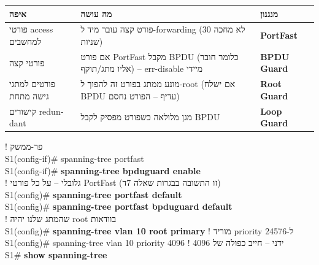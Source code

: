 \documentclass[11pt]{article}
\newcommand{\enLR}[1]{\textenglish{#1}}
\begin{document}
\begin{xltabular}{\linewidth}{|>{\setRTL\raggedleft\arraybackslash}X|>{\setRTL\raggedleft\arraybackslash}X|>{\setRTL\raggedleft\arraybackslash}X|}
\hline
{}\textbf{איפה} & \textbf{מה עושה} & \textbf{מנגנון} \\
\hline
\endhead
פורטי \enLR{access} למחשבים & פורט קצה עובר מיד ל-\enLR{forwarding} (לא מחכה \enLR{30} שניות) & \textbf{\enLR{PortFast}} \\
\hline
פורטי קצה & אם פורט \enLR{PortFast} מקבל \enLR{BPDU} (כלומר חובר אליו מתג/תוקף) – \enLR{err-disable} מיידי & \textbf{\enLR{BPDU Guard}} \\
\hline
פורטים למתגי גישה מתחת & מונע ממתג בפורט זה להפוך ל-\enLR{root} (אם ישלח \enLR{BPDU} עדיף – הפורט נחסם) & \textbf{\enLR{Root Guard}} \\
\hline
קישורים \enLR{redundant} & מגן מלולאה כשפורט מפסיק לקבל \enLR{BPDU} & \textbf{\enLR{Loop Guard}} \\
\hline
\end{xltabular}

\begin{codebox}\begin{english}\codefont\footnotesize\color{cfg}\setlength{\parindent}{0pt}
\textcolor{ccom}{\texthebrew{! פר-ממשק}}\\
S1(config-if)\# spanning-tree portfast\\
S1(config-if)\# \textcolor{cbold}{\textbf{spanning-tree bpduguard enable}}\\
\textcolor{ccom}{\texthebrew{! גלובלי – על כל פורטי \enLR{PortFast} (זו התשובה בבגרות שאלה \enLR{7}ד)}}\\
S1(config)\# \textcolor{cbold}{\textbf{spanning-tree portfast default}}\\
S1(config)\# \textcolor{cbold}{\textbf{spanning-tree portfast bpduguard default}}\\
\textcolor{ccom}{\texthebrew{! שהמתג שלנו יהיה \enLR{root} בוודאות}}\\
S1(config)\# \textcolor{cbold}{\textbf{spanning-tree vlan 10 root primary}}       \textcolor{ccom}{\texthebrew{! מוריד \enLR{priority} ל-\enLR{24576}}}\\
S1(config)\# spanning-tree vlan 10 priority 4096            \textcolor{ccom}{\texthebrew{! ידני – חייב כפולה של \enLR{4096}}}\\
S1\# \textcolor{cbold}{\textbf{show spanning-tree}}
\end{english}\end{codebox}
\end{document}
